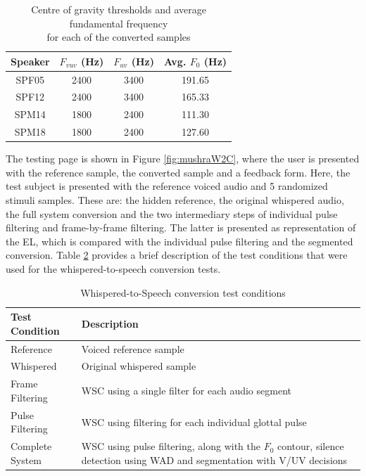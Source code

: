 \begin{table}[H]
    \centering
    \begin{tabular}{cccc}
        \hline
        Speaker & $F_{vuv}$ (Hz) & $F_{uv}$ (Hz) & Avg. $F_0$ (Hz)\\
        \hline \hline
        SPF05 & 2400 & 3400 & 191.65 \\ \hline 
        SPF12 & 2400 & 3400 & 165.33 \\ \hline
        SPM14 & 1800 & 2400 & 111.30 \\ \hline
        SPM18 & 1800 & 2400 & 127.60 \\ \hline
    \end{tabular}
    \caption{\centering Centre of gravity thresholds and average fundamental frequency \\ for each of the converted samples}
    \label{tab:w2cSettings}
\end{table}

The testing page is shown in Figure \ref{fig:mushraW2C}, where the user is presented with the reference sample, the converted sample and a feedback form. Here, the test subject is presented with the reference voiced audio and 5 randomized stimuli samples. These are: the hidden reference, the original whispered audio, the full system conversion and the two intermediary steps of individual pulse filtering and frame-by-frame filtering. The latter is presented as representation of the EL, which is compared with the individual pulse filtering and the segmented conversion. Table \ref{tab:w2cConditions} provides a brief description of the test conditions that were used for the whispered-to-speech conversion tests.

\begin{table}[H]
    \centering
    \begin{tabular}{p{}p{}}
        \hline 
        Test Condition & Description \\
        \hline \hline
        Reference & Voiced reference sample \\
        Whispered & Original whispered sample \\
        Frame Filtering & WSC using a single filter for each audio segment \\
        Pulse Filtering & WSC using filtering for each individual glottal pulse\\
        Complete System & WSC using pulse filtering, along with the $F_0$ contour, silence detection using WAD and segmentation with V/UV decisions \\
        \hline
    \end{tabular}
    \caption{Whispered-to-Speech conversion test conditions}
    \label{tab:w2cConditions}
\end{table}
    
